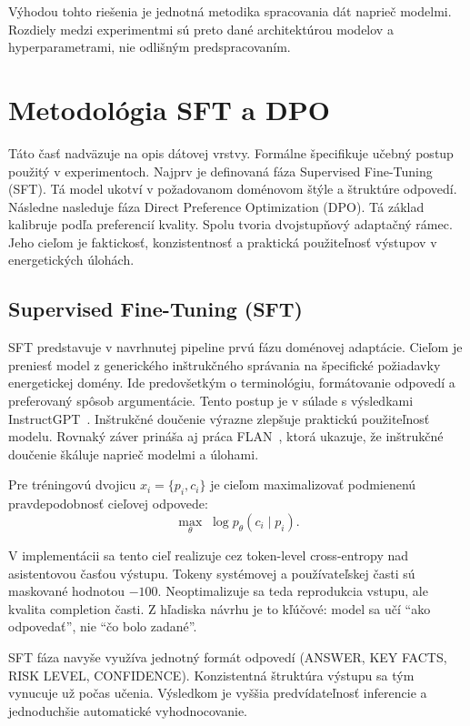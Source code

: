 Výhodou tohto riešenia je jednotná metodika spracovania dát naprieč modelmi. Rozdiely medzi experimentmi sú preto dané architektúrou modelov a hyperparametrami, nie odlišným predspracovaním.

\section{Metodológia SFT a DPO}

Táto časť nadväzuje na opis dátovej vrstvy. Formálne špecifikuje učebný postup použitý v experimentoch. Najprv je definovaná fáza Supervised Fine-Tuning (SFT). Tá model ukotví v požadovanom doménovom štýle a štruktúre odpovedí. Následne nasleduje fáza Direct Preference Optimization (DPO). Tá základ kalibruje podľa preferencií kvality. Spolu tvoria dvojstupňový adaptačný rámec. Jeho cieľom je faktickosť, konzistentnosť a praktická použiteľnosť výstupov v energetických úlohách.

\subsection{Supervised Fine-Tuning (SFT)}

SFT predstavuje v navrhnutej pipeline prvú fázu doménovej adaptácie. Cieľom je preniesť model z generického inštrukčného správania na špecifické požiadavky energetickej domény. Ide predovšetkým o terminológiu, formátovanie odpovedí a preferovaný spôsob argumentácie. Tento postup je v súlade s výsledkami InstructGPT~\cite{Ouyang2022InstructGPT}. Inštrukčné doučenie výrazne zlepšuje praktickú použiteľnosť modelu. Rovnaký záver prináša aj práca FLAN~\cite{Chung2022ScalingInstruction}, ktorá ukazuje, že inštrukčné doučenie škáluje naprieč modelmi a úlohami.

Pre tréningovú dvojicu $x_i = \{p_i, c_i\}$ je cieľom maximalizovať podmienenú pravdepodobnosť cieľovej odpovede:
\begin{equation}
    \max_{\theta} \; \log p_{\theta}(c_i \mid p_i).
\end{equation}

V implementácii sa tento cieľ realizuje cez token-level cross-entropy nad asistentovou časťou výstupu. Tokeny systémovej a používateľskej časti sú maskované hodnotou $-100$. Neoptimalizuje sa teda reprodukcia vstupu, ale kvalita completion časti. Z hľadiska návrhu je to kľúčové: model sa učí \enquote{ako odpovedať}, nie \enquote{čo bolo zadané}.

SFT fáza navyše využíva jednotný formát odpovedí (ANSWER, KEY FACTS, RISK LEVEL, CONFIDENCE). Konzistentná štruktúra výstupu sa tým vynucuje už počas učenia. Výsledkom je vyššia predvídateľnosť inferencie a jednoduchšie automatické vyhodnocovanie.

